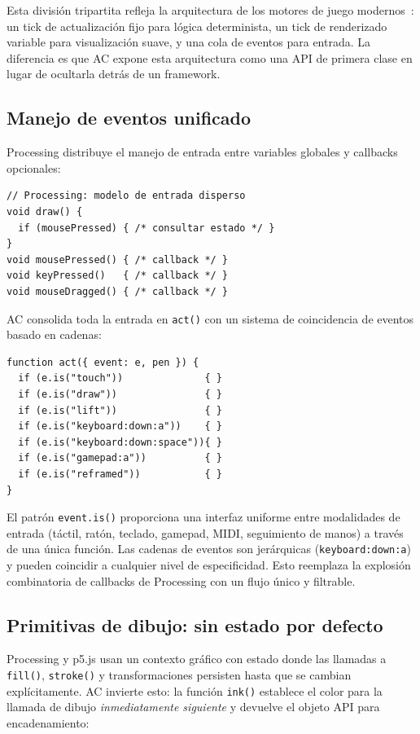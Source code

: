 \documentclass[10pt,letterpaper,twocolumn]{article}
\begin{document}
Esta división tripartita refleja la arquitectura de los motores de juego modernos~\citep{nystrom2014game}: un tick de actualización fijo para lógica determinista, un tick de renderizado variable para visualización suave, y una cola de eventos para entrada. La diferencia es que AC expone esta arquitectura como una API de primera clase en lugar de ocultarla detrás de un framework.

\subsection{Manejo de eventos unificado}

Processing distribuye el manejo de entrada entre variables globales y callbacks opcionales:

\begin{lstlisting}[style=processingstyle]
// Processing: modelo de entrada disperso
void draw() {
  if (mousePressed) { /* consultar estado */ }
}
void mousePressed() { /* callback */ }
void keyPressed()   { /* callback */ }
void mouseDragged() { /* callback */ }
\end{lstlisting}

AC consolida toda la entrada en \texttt{act()} con un sistema de coincidencia de eventos basado en cadenas:

\begin{lstlisting}[style=acjsstyle]
function act({ event: e, pen }) {
  if (e.is("touch"))              { }
  if (e.is("draw"))               { }
  if (e.is("lift"))               { }
  if (e.is("keyboard:down:a"))    { }
  if (e.is("keyboard:down:space")){ }
  if (e.is("gamepad:a"))          { }
  if (e.is("reframed"))           { }
}
\end{lstlisting}

El patrón \texttt{event.is()} proporciona una interfaz uniforme entre modalidades de entrada (táctil, ratón, teclado, gamepad, MIDI, seguimiento de manos) a través de una única función. Las cadenas de eventos son jerárquicas (\texttt{keyboard:down:a}) y pueden coincidir a cualquier nivel de especificidad. Esto reemplaza la explosión combinatoria de callbacks de Processing con un flujo único y filtrable.

\subsection{Primitivas de dibujo: sin estado por defecto}

Processing y p5.js usan un contexto gráfico con estado donde las llamadas a \texttt{fill()}, \texttt{stroke()} y transformaciones persisten hasta que se cambian explícitamente. AC invierte esto: la función \texttt{ink()} establece el color para la llamada de dibujo \emph{inmediatamente siguiente} y devuelve el objeto API para encadenamiento:
\end{document}
